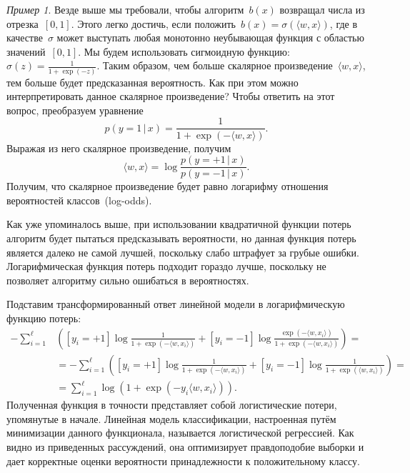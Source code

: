 \documentclass[a4paper, 12pt]{article}
\newcommand{\cond}{\mspace{3mu}{|}\mspace{3mu}}
\theoremstyle{plain} %
\theoremstyle{definition} %
\theoremstyle{remark} %
\newtheorem{example}{Пример}
\begin{document}
\begin{example}
Везде выше мы требовали, чтобы алгоритм~$b(x)$ возвращал числа из отрезка~$[0, 1]$.
Этого легко достичь, если положить~$b(x) = \sigma(\langle w, x \rangle)$,
где в качестве~$\sigma$ может выступать любая монотонно неубывающая функция
с областью значений~$[0, 1]$.
Мы будем использовать сигмоидную функцию: $\sigma(z) = \frac{1}{1 + \exp(-z)}$.
Таким образом, чем больше скалярное произведение~$\langle w, x \rangle$,
тем больше будет предсказанная вероятность.
Как при этом можно интерпретировать данное скалярное произведение?
Чтобы ответить на этот вопрос, преобразуем уравнение
\[
    p(y = 1 \cond x)
    =
    \frac{1}{1 + \exp(-\langle w, x \rangle)}.
\]
Выражая из него скалярное произведение, получим
\[
    \langle w, x \rangle
    =
    \log
    \frac{
        p(y = +1 \cond x)
    }{
        p(y = -1 \cond x)
    }.
\]
Получим, что скалярное произведение будет равно логарифму отношения
вероятностей классов~(log-odds).

Как уже упоминалось выше, при использовании квадратичной функции потерь
алгоритм будет пытаться предсказывать вероятности,
но данная функция потерь является далеко не самой лучшей,
поскольку слабо штрафует за грубые ошибки.
Логарифмическая функция потерь подходит гораздо лучше, поскольку не позволяет алгоритму
сильно ошибаться в вероятностях.

Подставим трансформированный ответ линейной модели в логарифмическую функцию потерь:
\begin{align*}
    -\sum_{i = 1}^{\ell} &\left(
        [y_i = +1]
        \log \frac{1}{1 + \exp(-\langle w, x_i \rangle)}
        +
        [y_i = -1]
        \log \frac{\exp(-\langle w, x_i \rangle)}{1 + \exp(-\langle w, x_i \rangle)}
    \right)
    =\\
    &=
    -\sum_{i = 1}^{\ell} \left(
        [y_i = +1]
        \log \frac{1}{1 + \exp(-\langle w, x_i \rangle)}
        +
        [y_i = -1]
        \log \frac{1}{1 + \exp(\langle w, x_i \rangle)}
    \right)
    =\\
    &=
    \sum_{i = 1}^{\ell}
        \log \left(
            1 + \exp(-y_i \langle w, x_i \rangle)
        \right).
\end{align*}
Полученная функция в точности представляет собой логистические потери,
упомянутые в начале.
Линейная модель классификации, настроенная путём минимизации данного функционала,
называется логистической регрессией.
Как видно из приведенных рассуждений, она оптимизирует
правдоподобие выборки и дает корректные оценки вероятности принадлежности к положительному классу.


\end{example}
\end{document}
